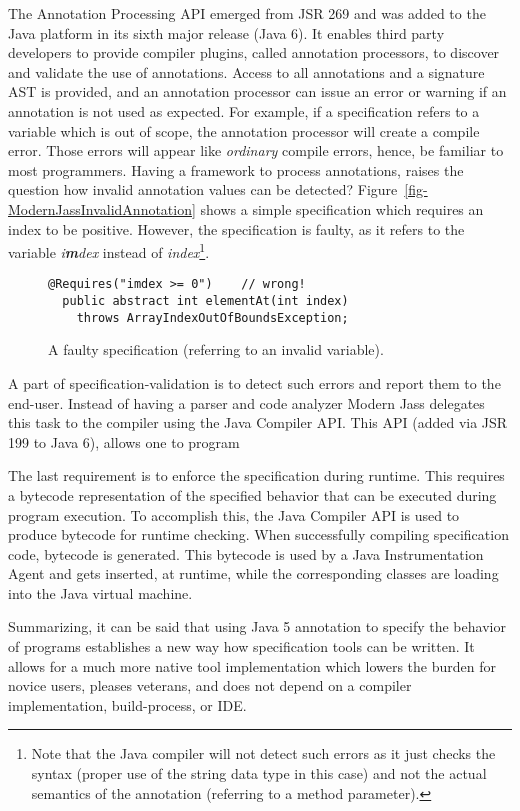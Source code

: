 \documentclass{llncs}
\newcommand{\figref}[1]{Figure~\vref{#1}}
\begin{document}
The Annotation Processing API emerged from JSR 269 and was added to the Java platform in its sixth major release (Java 6). It enables third party developers to provide compiler plugins, called annotation processors, to discover and validate the use of annotations. Access to all annotations and a signature AST is provided, and an annotation processor can issue an error or warning if an annotation is not used as expected. For example, if a specification refers to a variable which is out of scope, the annotation processor will create a compile error. Those errors will appear like \textit{ordinary} compile errors, hence, be familiar to most programmers. Having a framework to process annotations, raises the question how invalid annotation values can be detected? \figref{fig-ModernJassInvalidAnnotation} shows a simple specification which requires an index to be positive. However, the specification is faulty, as it refers to the variable \textit{i\textbf{m}dex} instead of \textit{index}\footnote{Note that the Java compiler will not detect such errors as it just checks the syntax (proper use of the string data type in this case) and not the actual semantics of the annotation (referring to a method parameter).}.
\begin{figure}[ht]
\begin{lstlisting}[language={[JML5]Java}]
  @Requires("imdex >= 0")    // wrong!
  public abstract int elementAt(int index)
    throws ArrayIndexOutOfBoundsException;
\end{lstlisting}
\caption{A faulty specification (referring to an invalid variable).}
\label{fig-ModernJassInvalidAnnotation}
\end{figure}
A part of specification-validation is to detect such errors and report them to the end-user. Instead of having a parser and code analyzer Modern Jass delegates this task to the compiler using the Java Compiler API. This API (added via JSR 199 to Java 6), allows one to program

The last requirement is to enforce the specification during runtime. This requires a bytecode representation of the specified behavior that can be executed during program execution. To accomplish this, the Java Compiler API is used to produce bytecode for runtime checking. When successfully compiling specification code, bytecode is generated. This bytecode is used by a Java Instrumentation Agent and gets inserted, at runtime, while the corresponding classes are loading into the Java virtual machine. 

Summarizing, it can be said that using Java 5 annotation to specify the behavior of programs establishes a new way how specification tools can be written. It allows for a much more native tool implementation which lowers the burden for novice users, pleases veterans, and does not depend on a compiler implementation, build-process, or IDE.
\end{document}
